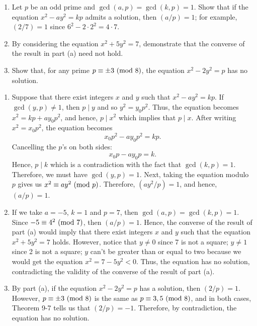 \begin{exercise}
    \begin{enumerate}
        \item Let $p$ be an odd prime and $\gcd(a,p) = \gcd(k,p) = 1$. Show that if the equation $x^2 - ay^2 = kp$ admits a solution, then $(a/p) = 1$; for example, $(2/7) = 1$ since $6^2 - 2\cdot 2^2 = 4\cdot 7$. 
        \item By considering the equation $x^2 + 5y^2 = 7$, demonstrate that the converse of the result in part (a) need not hold.
        \item Show that, for any prime $p \equiv \pm 3 \ (\mathrm{mod}\ 8)$, the equation $x^2 - 2y^2 = p$ has no solution.\\
    \end{enumerate}
\end{exercise}

\begin{solution}
    \begin{enumerate}
        \item Suppose that there exist integers $x$ and $y$ such that $x^2 - ay^2 = kp$. If $\gcd(y,p) \neq 1$, then $p \mid y$ and so $y^2 = y_0 p^2$. Thus, the equation becomes $x^2 = kp + ay_0 p^2$, and hence, $p \mid x^2$ which implies that $p \mid x$. After writing $x^2 = x_0 p^2$, the equation becomes
        $$x_0 p^2 - ay_0 p^2 = kp.$$
        Cancelling the $p$'s on both sides:
        $$x_0 p - ay_0 p = k.$$
        Hence, $p \mid k$ which is a contradiction with the fact that $\gcd(k,p) = 1$. Therefore, we must have $\gcd(y,p) = 1$. Next, taking the equation modulo $p$ gives us $x^2 \equiv a y^2 \ (\mathrm{mod}\ p)$. Therefore, $(ay^2/p) = 1$, and hence, $(a/p) = 1$.
        \item If we take $a = -5$, $k = 1$ and $p = 7$, then $\gcd(a,p) = \gcd(k,p) = 1$. Since $-5 \equiv 4^2 \ (\mathrm{mod}\ 7)$, then $(a/p) = 1$. Hence, the converse of the result of part (a) would imply that there exist integers $x$ and $y$ such that the equation $x^2 + 5y^2 = 7$ holds. However, notice that $y\neq 0$ since 7 is not a square; $y \neq 1$ since 2 is not a square; $y$ can't be greater than or equal to two because we would get the equation $x^2 = 7 - 5y^2 < 0$. Thus, the equation has no solution, contradicting the validity of the converse of the result of part (a).
        \item By part (a), if the equation $x^2 - 2y^2 = p$ has a solution, then $(2/p) = 1$. However, $p \equiv \pm 3 \ (\mathrm{mod}\ 8)$ is the same as $p \equiv 3,5 \ (\mathrm{mod}\ 8)$, and in both cases, Theorem 9-7 tells us that $(2/p) = -1$. Therefore, by contradiction, the equation has no solution.\\
    \end{enumerate}
\end{solution}

